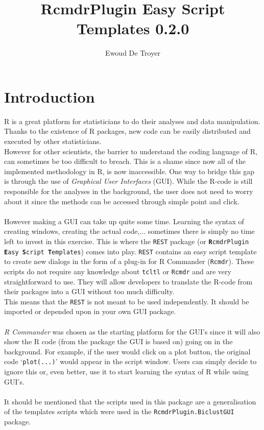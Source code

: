 \documentclass[a4paper]{article}\usepackage[]{graphicx}\usepackage[]{color}
\title{RcmdrPlugin Easy Script Templates 0.2.0}
\author{Ewoud De Troyer}
\begin{document}
\maketitle
\tableofcontents
\newpage
\section{Introduction}
R is a great platform for statisticians to do their analyses and data
manipulation. Thanks to the existence of R packages, new code can be easily
distributed and executed by other statisticians.\\
However for other scientists, the barrier to understand the coding language of
R, can sometimes be too difficult to breach. This is a shame since now all of
the implemented methodology in R, is now inaccessible. One way to bridge this gap is
through the use of {\it Graphical User Interfaces} (GUI). While the R-code is
still responsible for the analyses in the background, the user does not need to
worry about it since the methods can be accessed through simple point and click.
\\ \\
However making a GUI can take up quite some time. Learning the syntax of
creating windows, creating the actual code,... sometimes there is simply no time left to
invest in this exercise. This is where the \texttt{REST} package (or
\texttt{{\bf R}cmdrPlugin {\bf E}asy {\bf S}cript {\bf T}emplates}) comes into
play. \texttt{REST} contains an easy script template to create new dialogs in
the form of a plug-in for R Commander (\texttt{Rcmdr}). These scripts do not
require any knowledge about \texttt{tcltl} or \texttt{Rcmdr} and are very
straightforward to use. They will allow developers to translate the R-code from
their packages into a GUI without too much difficulty.\\
This means that the \texttt{REST} is not meant to be used independently. It
should be imported or depended upon in your own GUI package.
\\ \\
{\it R Commander} was chosen as the starting platform for the GUI's since it
will also show the R code (from the package the GUI is based on) going on in the
background. For example, if the user would click on a plot button, the original
code `\texttt{plot(...)}' would appear in the script window. Users can simply
decide to ignore this or, even better, use it to start learning the syntax of R
while using GUI's.
\\ \\
It should be mentioned that the scripts used in this package are a
generalisation of the templates scripts which were used in the
\texttt{RcmdrPlugin.BiclustGUI} package.
\end{document}
